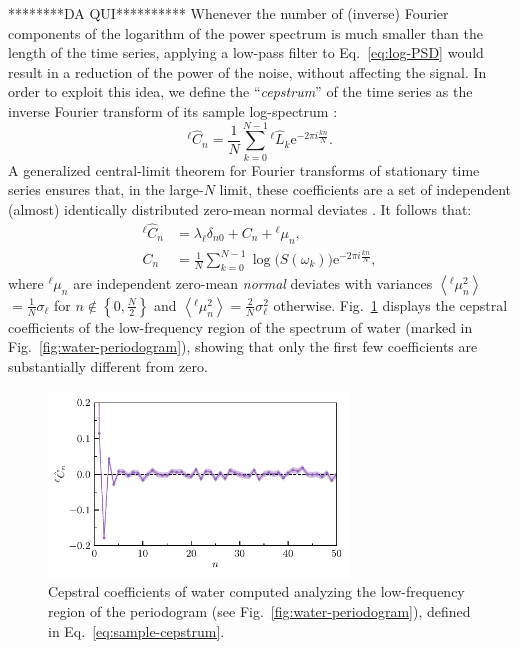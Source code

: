 ********DA QUI**********
Whenever the number of (inverse) Fourier components of the logarithm of the power spectrum is much smaller than the length of the time series, applying a low-pass filter to Eq.~\eqref{eq:log-PSD} would result in a reduction of the power of the noise, without affecting the signal. In order to exploit this idea, we define the ``\emph{cepstrum}'' of the time series as the inverse Fourier transform of its sample log-spectrum \citep{Childers1977}:
\begin{equation}
  ^{\ell\!} \hat C_{n} = \frac{1}{N}\sum_{k=0}^{N-1} {^{\ell\!} \hat L_{k}} \mathrm{e}^{-2\pi i\frac{kn}{N}}. \label{eq:sample-cepstrum}
\end{equation}
A generalized central-limit theorem for Fourier transforms of stationary time series ensures that, in the large-$N$ limit, these coefficients are a set of independent (almost) identically distributed zero-mean normal deviates \citep{Anderson1994,Peligrad2010}. It follows that:
\begin{equation}
  \begin{aligned}
    ^{\ell\!} \hat  C_{n} &= \lambda_{\ell} \delta_{n0} + C_{n} +  {^{{\ell\!}}{\mu}}_{n}, \\
    C_{n} &= \frac{1}{N}\sum_{k=0}^{N-1} \log\bigl (S(\omega_k) \bigr ) \mathrm{e}^{-2\pi i\frac{kn}{N}},
  \end{aligned} \label{eq:cepstrogram}
\end{equation}
where $^{{\ell\!}}{\mu}_{n}$ are independent zero-mean \emph{normal} deviates with variances $\left\langle {^{{\ell\!}}{\mu}_{n}^2}  \right\rangle$ $=\frac{1}{N}\sigma_\ell$ for $n\notin\left\{ 0,\frac{N}{2}\right\}$ and $\left\langle ^{{\ell\!}}{\mu}_{n}^{2}\right\rangle =\frac{2}{N}\sigma_{\ell}^{2}$
otherwise.
Fig.~\ref{fig:water-cepstrum} displays the cepstral coefficients of the low-frequency region of the spectrum of water (marked in Fig.~\ref{fig:water-periodogram}), showing that only the first few coefficients are substantially different from zero.

\begin{figure}
\centering
\includegraphics[width=8cm]{chapters/chapter5/figures/handbook_water_cepstrum.pdf}
\caption{Cepstral coefficients of water computed analyzing the low-frequency region of the periodogram (see Fig.~\ref{fig:water-periodogram}), defined in Eq.~\eqref{eq:sample-cepstrum}. }  \label{fig:water-cepstrum}
\end{figure}

